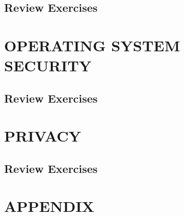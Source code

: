\documentclass[a4paper, 10 pt, conference]{ieeeconf}
\begin{document}
\subsection{\textbf{Review Exercises}}






\section{\textbf{OPERATING SYSTEM SECURITY}}
\subsection{\textbf{Review Exercises}}






\section{\textbf{PRIVACY}}
\subsection{\textbf{Review Exercises}}

\section*{APPENDIX}



\end{document}
